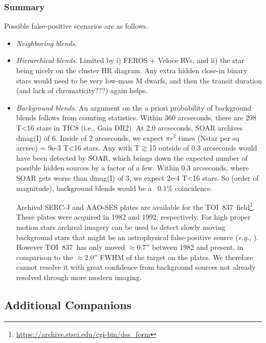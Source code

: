 \documentclass[12pt,twocolumn,tighten]{aastex62}
\newcommand{\tn}{TOI~837} %
\begin{document}
\subsubsection{Summary}

Possible false-positive scenarios are as follows.

\begin{itemize}
  \item {\it Neighboring blends}.

  \item {\it Hierarchical blends}.
    Limited by i) FEROS + Veloce RVs, and ii) the star being nicely on the
    cluster HR diagram. Any extra hidden close-in binary stars would
    need to be very low-mass M dwarfs, and then the transit duration
		(and lack of chromaticity???) again helps.

  \item {\it Background blends}.
	An argument on the a priori probability of background blends follows from
	counting statistics. Within 360 arcseconds, there are 298 T<16 stars in TIC8
	(i.e., Gaia DR2). At 2.0 arcseconds, SOAR archives dmag(I) of 6. Inside of 2
	arcseconds, we expect $\pi r^2 $ times (Nstar per sq arcsec) = 9e-3 T<16 stars.
	Any with T$\gtrsim$15 outside of 0.3 arcseconds would have been detected by
	SOAR, which brings down the expected number of possible hidden sources by a
	factor of a few.  Within 0.3 arcseconds, where SOAR gets worse than dmag(I) of
	3, we expect 2e-4 T<16 stars. So (order of magnitude), background blends would
	be a ~0.1\% coincidence.

    Archival SERC-J and AAO-SES plates are available for the \tn\
    field\footnote{\url{https://archive.stsci.edu/cgi-bin/dss_form}}.
    These plates were acquired in 1982 and 1992, respectively.
    For high proper motion stars archival imagery can be used to
    detect slowly moving background stars that might be an
    astrophysical false-positive source
    ({\it e.g.}, \citealt{huang_pimen_2018}).
    However \tn\ has only moved $\approx0.7''$ between 1982 and
    present, in comparison to the $\approx2.0''$ FWHM of the target on
    the plates.
    We therefore cannot resolve it with great confidence from
    background sources not already resolved through more modern
    imaging.

\end{itemize}


\subsection{Additional Companions}
\end{document}
